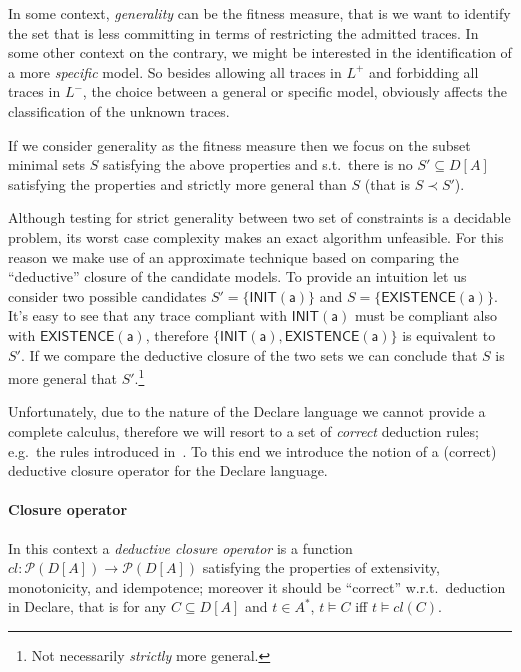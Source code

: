 In some context, \emph{generality} can be the fitness measure, that is we want to identify the set that is less committing in terms of restricting the admitted traces. In some other context on the contrary, we might be interested in the identification of a more \emph{specific} model. So besides allowing all traces in $L^+$ and forbidding all traces in $L^-$, the choice between a general or specific model, obviously affects the classification of the unknown traces.

If we consider generality as the fitness measure then we focus on the subset minimal sets $S$ satisfying the above properties and s.t.\ there is no $S'\subseteq D[A]$ satisfying the properties and strictly more general than $S$ (that is $S\prec S'$).

Although testing for strict generality between two set of constraints is a decidable problem, its worst case complexity makes an exact algorithm unfeasible. For this reason we make use of an approximate technique based on comparing the ``deductive'' closure of the candidate models. 
%
To provide an intuition let us consider two possible candidates $S' = \{\mathsf{INIT(a)}\}$ and $S = \{\mathsf{EXISTENCE(a)}\}$. It's easy to see that any trace compliant with $\mathsf{INIT(a)}$ must be compliant also with $\mathsf{EXISTENCE(a)}$, therefore $\{\mathsf{INIT(a), EXISTENCE(a)}\}$ is equivalent to $S'$. If we compare the deductive closure of the two sets we can conclude that $S$ is more general that $S'$.\footnote{Not necessarily \emph{strictly} more general.}

Unfortunately, due to the nature of the Declare language we cannot provide a complete calculus, therefore we will resort to a set of \emph{correct} deduction rules; e.g.\ the rules introduced in~\cite{???}. To this end we introduce the notion of a (correct) deductive closure operator for the Declare language.

\paragraph{Closure operator} In this context a \emph{deductive closure operator} is a function $cl: \mathcal{P}(D[A])\rightarrow\mathcal{P}(D[A])$ satisfying the properties of extensivity, monotonicity, and idempotence; moreover it should be ``correct'' w.r.t.\ deduction in Declare, that is for any $C\subseteq D[A]$ and $t\in A^*$, $t\models C$ iff $t\models cl(C)$.

